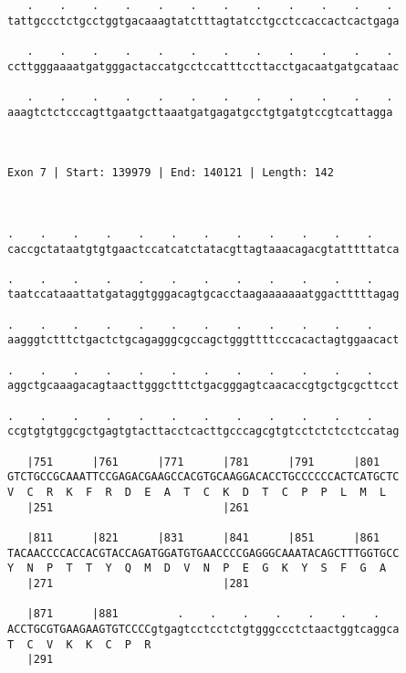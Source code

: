 \documentclass{article}
\begin{document}
\begin{Verbatim}
   .    .    .    .    .    .    .    .    .    .    .    . 
tattgccctctgcctggtgacaaagtatctttagtatcctgcctccaccactcactgaga
                                                            
   .    .    .    .    .    .    .    .    .    .    .    . 
ccttgggaaaatgatgggactaccatgcctccatttccttacctgacaatgatgcataac
                                                            
   .    .    .    .    .    .    .    .    .    .    .    .
aaagtctctcccagttgaatgcttaaatgatgagatgcctgtgatgtccgtcattagga
                                                           
                                                           
 
Exon 7 | Start: 139979 | End: 140121 | Length: 142



.    .    .    .    .    .    .    .    .    .    .    .    
caccgctataatgtgtgaactccatcatctatacgttagtaaacagacgtatttttatca
                                                            
.    .    .    .    .    .    .    .    .    .    .    .    
taatccataaattatgataggtgggacagtgcacctaagaaaaaaatggactttttagag
                                                            
.    .    .    .    .    .    .    .    .    .    .    .    
aagggtctttctgactctgcagagggcgccagctgggttttcccacactagtggaacact
                                                            
.    .    .    .    .    .    .    .    .    .    .    .    
aggctgcaaagacagtaacttgggctttctgacgggagtcaacaccgtgctgcgcttcct
                                                            
.    .    .    .    .    .    .    .    .    .    .    .    
ccgtgtgtggcgctgagtgtacttacctcacttgcccagcgtgtcctctctcctccatag
                                                            
   |751      |761      |771      |781      |791      |801   
GTCTGCCGCAAATTCCGAGACGAAGCCACGTGCAAGGACACCTGCCCCCCACTCATGCTC
V  C  R  K  F  R  D  E  A  T  C  K  D  T  C  P  P  L  M  L  
   |251                          |261                       
  
   |811      |821      |831      |841      |851      |861   
TACAACCCCACCACGTACCAGATGGATGTGAACCCCGAGGGCAAATACAGCTTTGGTGCC
Y  N  P  T  T  Y  Q  M  D  V  N  P  E  G  K  Y  S  F  G  A  
   |271                          |281                       
  
   |871      |881         .    .    .    .    .    .    .   
ACCTGCGTGAAGAAGTGTCCCCgtgagtcctcctctgtgggccctctaactggtcaggca
T  C  V  K  K  C  P  R                                      
   |291                                                     
  

\end{Verbatim}
\end{document}
